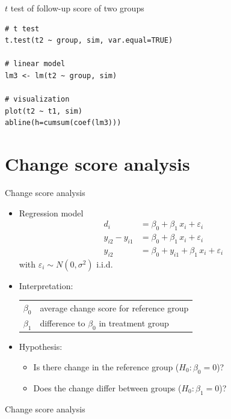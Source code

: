 \documentclass[aspectratio=169]{beamer}
\begin{document}
\begin{frame}[fragile]{$t$ test of follow-up score of two groups}
\begin{lstlisting}
# t test
t.test(t2 ~ group, sim, var.equal=TRUE)

# linear model
lm3 <- lm(t2 ~ group, sim)

# visualization
plot(t2 ~ t1, sim)
abline(h=cumsum(coef(lm3)))
\end{lstlisting}
\end{frame}

\section{Change score analysis}

\begin{frame}{Change score analysis}
\begin{itemize}
  \item Regression model
    \begin{align*}
                  d_i &= \beta_0 + \beta_1 \, x_i + \varepsilon_i \\
      y_{i2} - y_{i1} &= \beta_0 + \beta_1 \, x_i + \varepsilon_i \\
               y_{i2} &= \beta_0 + y_{i1} + \beta_1 \, x_i + \varepsilon_i
    \end{align*}
    with $\varepsilon_i \sim N(0, \sigma^2)$ i.i.d.
  \item Interpretation:
    \begin{tabular}{lp{10cm}}
    $\beta_0$ & average change score for reference group\\
    $\beta_1$ & difference to $\beta_0$ in treatment group
    \end{tabular}
  \item Hypothesis:
    \begin{itemize}
        \item Is there change in the reference group ($H_0\colon \beta_0 = 0$)?
        \item Does the change differ between groups ($H_0\colon \beta_1 =0$)?
    \end{itemize}
\end{itemize}
\end{frame}


\begin{frame}{Change score analysis}
\begin{center}
\end{center}
\end{frame}
\end{document}
